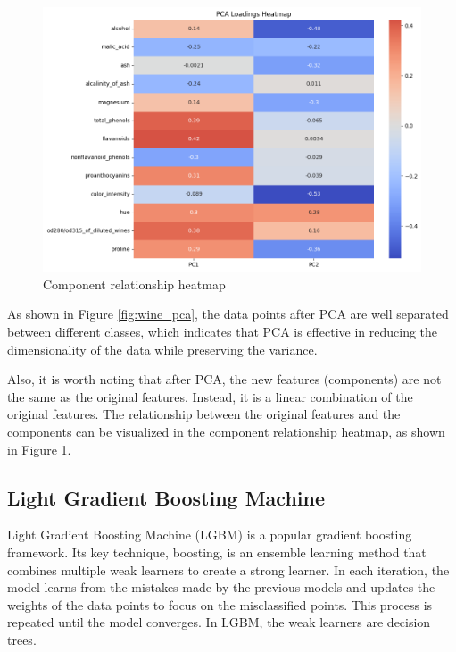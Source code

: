 \documentclass[conference]{IEEEtran}
\begin{document}
\begin{figure}[!ht]
    \centering
    \includegraphics[width=\linewidth]{figure/Wine PCA Heatmap.png}
    \caption{Component relationship heatmap}
    \label{fig:wine_pca_heatmap}
\end{figure}

As shown in Figure \ref{fig:wine_pca}, the data points after PCA are well separated between different classes, which indicates that PCA is effective in reducing the dimensionality of the data while preserving the variance.

Also, it is worth noting that after PCA, the new features (components) are not the same as the original features.
Instead, it is a linear combination of the original features.
The relationship between the original features and the components can be visualized in the component relationship heatmap, as shown in Figure \ref{fig:wine_pca_heatmap}.

\subsection{Light Gradient Boosting Machine}

Light Gradient Boosting Machine (LGBM) \cite{zhang2017gpuacceleration} is a popular gradient boosting framework.
Its key technique, boosting, is an ensemble learning method that combines multiple weak learners to create a strong learner.
In each iteration, the model learns from the mistakes made by the previous models and updates the weights of the data points to focus on the misclassified points.
This process is repeated until the model converges.
In LGBM, the weak learners are decision trees.
\end{document}
